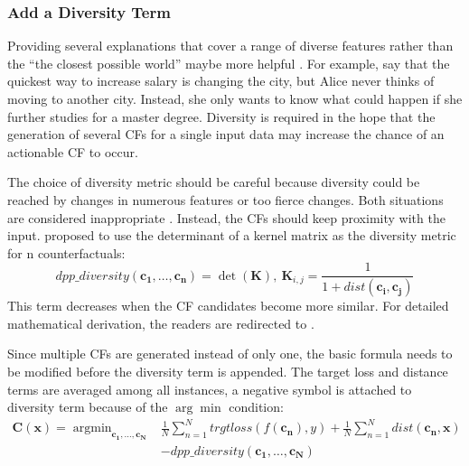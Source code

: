 \subsubsection{Add a Diversity Term}
Providing several explanations that cover a range of diverse features rather than the ``the closest possible world'' maybe more helpful \cite{watcher2017}. For example, say that the quickest way to increase salary is changing the city, but Alice never thinks of moving to another city. Instead, she only wants to know what could happen if she further studies for a master degree. Diversity is required in the hope that the generation of several CFs for a single input data may increase the chance of an actionable CF to occur.

The choice of diversity metric should be careful because diversity could be reached by changes in numerous features or too fierce changes. Both situations are considered inappropriate \cite{DiCE}. Instead, the CFs should keep proximity with the input. \citeauthor{DiCE} \cite{DiCE} proposed to use the determinant of a kernel matrix as the diversity metric for n counterfactuals:
\begin{equation}\label{eq:dpp}
  dpp\_diversity(\mathbf{c_1,\dots,c_n})=\det(\mathbf{K}),\ \mathbf{K}_{i,j}=\frac{1}{1+dist(\mathbf{c_i,c_j})}
\end{equation}
%
This term decreases when the CF candidates become more similar. For detailed mathematical derivation, the readers are redirected to \cite[second chapter]{kulesza2011dpp}.

Since multiple CFs are generated instead of only one, the basic formula needs to be modified before the diversity term is appended. The target loss and distance terms are averaged among all instances, a negative symbol is attached to diversity term because of the $\arg\min$ condition:
\begin{equation}\label{eq:DiCe}
\begin{split}
  \mathbf{C(x)}=\mathop{\arg\min}_{\mathbf{c_1,\dots,c_N}}&\frac{1}{N}\sum_{n=1}^{N}trgtloss(f(\mathbf{c_n}),y)
  +\frac{1}{N}\sum_{n=1}^{N}dist(\mathbf{c_n,x})
  \\&-dpp\_diversity(\mathbf{c_1,\dots,c_N})
\end{split}
\end{equation}

